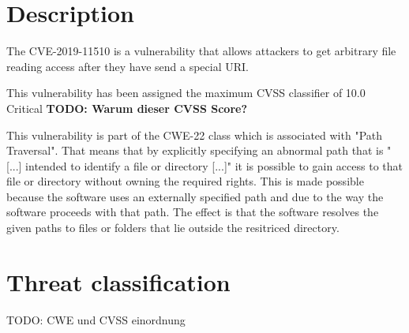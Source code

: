 

\section{Description}
\label{description}
The CVE-2019-11510 is a vulnerability that allows attackers to get arbitrary file reading access after they have send a special URI. \autocite{NVDCVE:online}

This vulnerability has been assigned the maximum CVSS classifier of 10.0 Critical \autocite{AWAKE:online} \textbf{TODO: Warum dieser CVSS Score?}

This vulnerability is part of the CWE-22 class which is associated with "Path Traversal". That means that by explicitly specifying an abnormal path that is "[...] intended to identify a file or directory [...]" \autocite{CWE22-Definition:online} it is possible to gain access to that file or directory without owning the required rights. This is made possible because the software uses an externally specified path and due to the way the software proceeds with that path. The effect is that the software resolves the given paths to files or folders that lie outside the resitriced directory. \autocite{CWE22-Definition:online}

\section{Threat classification}
\label{analysis}

TODO: CWE und CVSS einordnung

